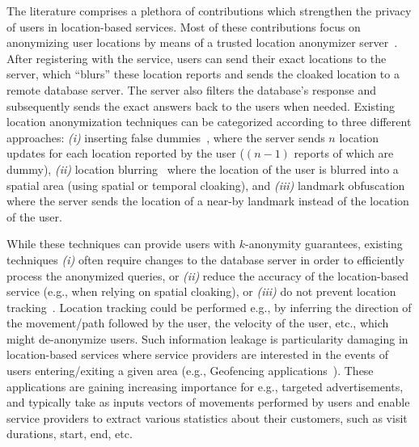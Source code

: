 \documentclass{llncs}
\begin{document}
The literature comprises a plethora of contributions which strengthen the privacy of users in location-based services. Most of these contributions focus on anonymizing user locations by means of a trusted
 location anonymizer server~\cite{Bamba:2008:SAL:1367497.1367531,Gruteser:2003:AUL:1066116.1189037,Kalnis:2007:PLI:1313047.1313203,Mokbel:2006:NCQ:1182635.1164193,Yiu:2010:ESS:1825238.1825264}. After registering with the service, users can send their exact locations to the server, which ``blurs'' these location reports and sends the cloaked location to a remote database server.
 The server also filters the database's response and subsequently sends the exact answers back to the users when needed. Existing location anonymization techniques can be categorized according to three different approaches: \emph{(i)} inserting false dummies~\cite{Kido05ananonymous}, where
 the server sends $n$ location updates for each location reported by the user ($(n-1)$ reports of which are dummy), \emph{(ii)} location blurring~\cite{Chow:2007:EPC:1784462.1784477,Bamba:2008:SAL:1367497.1367531,Gruteser:2003:AUL:1066116.1189037,Kalnis:2007:PLI:1313047.1313203,DBLP:conf/infocom/WangXHZLX12} where the location of the user is blurred into a
 spatial area (using spatial or temporal cloaking), and \emph{(iii)} landmark obfuscation~\cite{Hong:2004:APU:990064.990087} where the server sends the location of a near-by landmark instead of the location of the user.

 While these techniques can provide users with $k$-anonymity guarantees, existing techniques \emph{(i)} often require changes to the database server in order to efficiently process
 the anonymized queries, or \emph{(ii)} reduce the accuracy of the location-based service (e.g., when relying on spatial cloaking), or \emph{(iii)} do not prevent location tracking~\cite{Mokbel:2006:NCQ:1182635.1164193}. Location tracking
 could be performed e.g., by inferring the direction of the movement/path followed by the user, the velocity of
 the user, etc., which might de-anonymize users. Such information leakage is particularity damaging in location-based services where service providers are interested in the events of users entering/exiting
 a given area (e.g., Geofencing applications~\cite{Sheth:2009:GCW:1560004.1560029,geofencing,geofencing1,Shekhar:1999:SDR:627320.627970,Myllymaki:2003:HSI:775152.775168}). These applications are gaining increasing importance
 for e.g., targeted advertisements, and typically take as inputs
 vectors of movements
 performed by users and enable service
 providers to extract various statistics about their customers, such as visit durations, start, end, etc.
\end{document}
